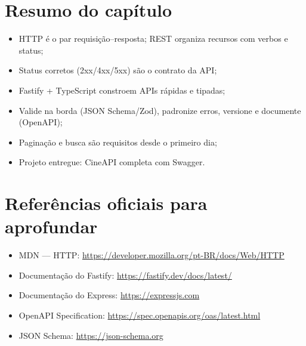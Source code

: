 \section{Resumo do capítulo}

\begin{itemize}[leftmargin=*, itemsep=0.3em]
  \item HTTP é o par requisição--resposta; REST organiza recursos com verbos e status;
  \item Status corretos (2xx/4xx/5xx) são o contrato da API;
  \item Fastify + TypeScript constroem APIs rápidas e tipadas;
  \item Valide na borda (JSON Schema/Zod), padronize erros, versione e documente (OpenAPI);
  \item Paginação e busca são requisitos desde o primeiro dia;
  \item Projeto entregue: CineAPI completa com Swagger.
\end{itemize}

\section{Referências oficiais para aprofundar}

\begin{itemize}[leftmargin=*, itemsep=0.3em]
  \item MDN — HTTP: \url{https://developer.mozilla.org/pt-BR/docs/Web/HTTP}
  \item Documentação do Fastify: \url{https://fastify.dev/docs/latest/}
  \item Documentação do Express: \url{https://expressjs.com}
  \item OpenAPI Specification: \url{https://spec.openapis.org/oas/latest.html}
  \item JSON Schema: \url{https://json-schema.org}
\end{itemize}
